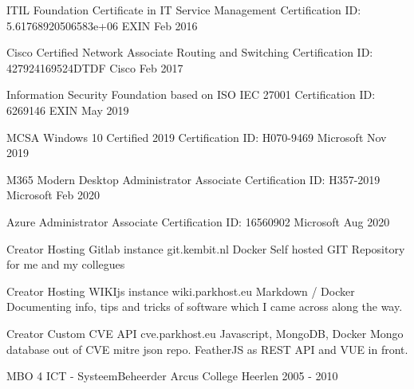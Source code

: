\documentclass[11pt, letterpaper]{awesome-cv}
\begin{document}
\begin{cvhonors}

  \cvhonor
    {ITIL Foundation Certificate in IT Service Management}
    {Certification ID: 5.61768920506583e+06}
    {EXIN}
    {Feb 2016}

  \cvhonor
    {Cisco Certified Network Associate Routing and Switching}
    {Certification ID: 427924169524DTDF}
    {Cisco}
    {Feb 2017}

  \cvhonor
    {Information Security Foundation based on ISO IEC 27001}
    {Certification ID: 6269146}
    {EXIN}
    {May 2019}

  \cvhonor
    {MCSA Windows 10 Certified 2019}
    {Certification ID: H070-9469}
    {Microsoft}
    {Nov 2019}

  \cvhonor
    {M365 Modern Desktop Administrator Associate}
    {Certification ID: H357-2019}
    {Microsoft}
    {Feb 2020}

  \cvhonor
    {Azure Administrator Associate}
    {Certification ID: 16560902}
    {Microsoft}
    {Aug 2020}


\end{cvhonors}

\begin{cventries}

  \cventry
    {Creator}
    {Hosting Gitlab instance}
    {git.kembit.nl}
    {Docker}
    {Self hosted GIT Repository for me and my collegues}

  \cventry
    {Creator}
    {Hosting WIKIjs instance}
    {wiki.parkhost.eu}
    {Markdown / Docker}
    {Documenting info, tips and tricks of software which I came across along the way.}

  \cventry
    {Creator}
    {Custom CVE API}
    {cve.parkhost.eu}
    {Javascript, MongoDB, Docker}
    {Mongo database out of CVE mitre json repo. FeatherJS as REST API and VUE in front.}


\end{cventries}

\begin{cventries}

  \cventry
    {MBO 4 ICT - SysteemBeheerder}
    {Arcus College}
    {Heerlen}
    {2005 - 2010}
    {
    }


\end{cventries}

\end{document}
